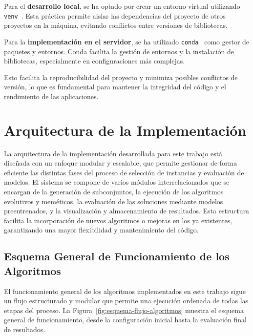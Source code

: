 Para el \textbf{desarrollo local}, se ha optado por crear un entorno virtual utilizando
\texttt{venv}~\cite{CreationVirtualEnvironments}.
Esta práctica permite aislar las dependencias del proyecto de otros proyectos en la máquina, evitando conflictos entre
versiones de bibliotecas.


Para la \textbf{implementación en el servidor}, se ha utilizado \texttt{conda}~\cite{CondaDocumentation} como gestor
de paquetes y entornos.
Conda facilita la gestión de entornos y la instalación de bibliotecas, especialmente en configuraciones más complejas.



Esto facilita la reproducibilidad del proyecto y minimiza posibles conflictos de versión, lo que es fundamental para
mantener la integridad del código y el rendimiento de las aplicaciones.

\section{Arquitectura de la Implementación}\label{sec:arquitectura-de-la-implementacion}
La arquitectura de la implementación desarrollada para este trabajo está diseñada con un enfoque modular y escalable, 
que permite gestionar de forma eficiente las distintas fases del proceso de selección de instancias y evaluación de modelos.
El sistema se compone de varios módulos interrelacionados que se encargan de la generación de subconjuntos, 
la ejecución de los algoritmos evolutivos y meméticos, la evaluación de las soluciones mediante modelos preentrenados, y la visualización y almacenamiento de resultados.
Esta estructura facilita la incorporación de nuevos algoritmos o mejoras en los ya existentes, garantizando una mayor flexibilidad y mantenimiento del código.

\subsection{Esquema General de Funcionamiento de los Algoritmos}\label{subsec:esquema-algoritmos}
El funcionamiento general de los algoritmos implementados en este trabajo sigue un flujo estructurado y modular que permite una ejecución ordenada de todas las etapas del proceso.
La Figura~\ref{fig:esquema-flujo-algoritmos} muestra el esquema general de funcionamiento, desde la configuración inicial hasta la evaluación final de resultados.

